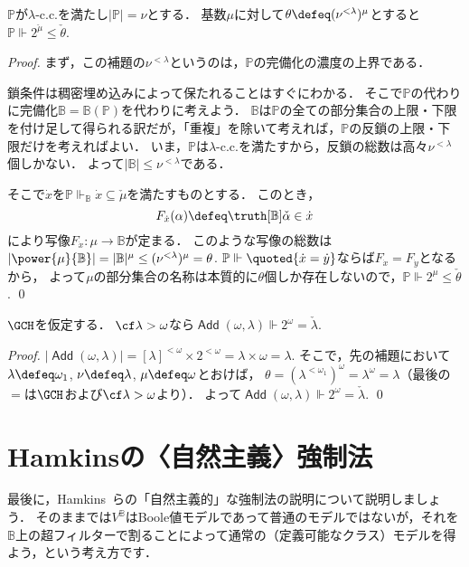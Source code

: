 \documentclass[a4j]{ltjsarticle}
\DeclareMathOperator{\Add}{\mathsf{Add}}
\begin{document}
\begin{lemma}
 $\mathbb{P}$が$\lambda$-c.c.を満たし$|\mathbb{P}| = \nu$とする．
 基数$\mu$に対して$\theta \defeq (\nu^{<\lambda})^\mu$とすると$\mathbb{P} \Vdash 2^{\check{\mu}} \leq \check{\theta}$.
\end{lemma}
\begin{proof}
 まず，この補題の$\nu^{<\lambda}$というのは，$\mathbb{P}$の完備化の濃度の上界である．

 鎖条件は稠密埋め込みによって保たれることはすぐにわかる．
 そこで$\mathbb{P}$の代わりに完備化$\mathbb{B} = \mathbb{B}(\mathbb{P})$を代わりに考えよう．
 $\mathbb{B}$は$\mathbb{P}$の全ての部分集合の上限・下限を付け足して得られる訳だが，「重複」を除いて考えれば，$\mathbb{P}$の反鎖の上限・下限だけを考えればよい．
 いま，$\mathbb{P}$は$\lambda$-c.c.を満たすから，反鎖の総数は高々$\nu^{<\lambda}$個しかない．
 よって$|\mathbb{B}| \leq \nu^{<\lambda}$である．

 そこで$\dot{x}$を$\mathbb{P} \Vdash_{\mathbb{B}} \dot{x} \subseteq \check{\mu}$を満たすものとする．
 このとき，
 \[
  F_{\dot{x}}(\alpha) \defeq \truth[\mathbb{B}]{\check{\alpha} \in \dot{x}}
 \]
 により写像$F_{\dot{x}}: \mu \to \mathbb{B}$が定まる．
 このような写像の総数は$|\power{\mu}{\mathbb{B}}| = |\mathbb{B}|^\mu \leq (\nu^{<\lambda})^\mu = \theta$.
 $\mathbb{P} \Vdash \quoted{\dot{x} = \dot{y}}$ならば$F_{\dot{x}} = F_{\dot{y}}$となるから，
 よって$\mu$の部分集合の名称は本質的に$\theta$個しか存在しないので，$\mathbb{P} \Vdash 2^{\mu} \leq \check{\theta}$. \qed
\end{proof}

\begin{corollary}
 $\GCH$を仮定する．
 $\cf \lambda > \omega$なら$\Add(\omega, \lambda) \Vdash 2^{\omega} = \check{\lambda}$.
\end{corollary}
\begin{proof}
 $|\Add(\omega, \lambda)| = [\lambda]^{<\omega} \times 2^{<\omega} = \lambda \times \omega = \lambda$.
 そこで，先の補題において$\lambda \defeq \omega_1$, $\nu \defeq \lambda$, $\mu \defeq \omega$とおけば，
 $\theta = (\lambda^{<\omega_1})^\omega = \lambda^\omega = \lambda$（最後の$=$は$\GCH$および$\cf \lambda > \omega$より）．
 よって$\Add(\omega, \lambda) \Vdash 2^\omega = \check{\lambda}.$ \qed
\end{proof}

\section{Hamkinsの〈自然主義〉強制法}
最後に，Hamkins~\cite{Hamkins:2012qv}らの「自然主義的」な強制法の説明について説明しましょう．
そのままでは$V^{\mathbb{B}}$はBoole値モデルであって普通のモデルではないが，それを$\mathbb{B}$上の超フィルターで割ることによって通常の（定義可能なクラス）モデルを得よう，という考え方です．
\end{document}
